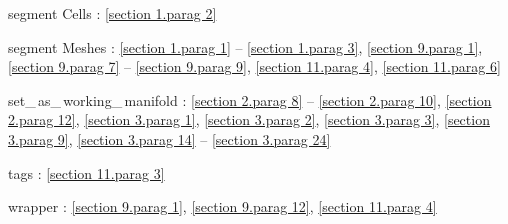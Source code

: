 \documentclass[a4paper]{scrreprt}
\def\numb{}
\newcommand\verm[1]{\textcolor{manif}{#1}}
\renewcommand\tt{\normalfont\ttfamily}
\begin{document}
\noindent
segment {\small\tt \verm{Cell}}s : \ref{\numb section 1.\numb parag 2}

\noindent
segment {\small\tt \verm{Mesh}}es :
\ref{\numb section 1.\numb parag 1} -- \ref{\numb section 1.\numb parag 3},
\ref{\numb section 9.\numb parag 1}, \ref{\numb section 9.\numb parag 7} --
\ref{\numb section 9.\numb parag 9}, \ref{\numb section 11.\numb parag 4},
\ref{\numb section 11.\numb parag 6}

\noindent
{\small\tt set\_\,as\_\,working\_\,manifold} :
\ref{\numb section 2.\numb parag 8} -- \ref{\numb section 2.\numb parag 10},
\ref{\numb section 2.\numb parag 12}, \ref{\numb section 3.\numb parag 1},
\ref{\numb section 3.\numb parag 2}, \ref{\numb section 3.\numb parag 3},
\ref{\numb section 3.\numb parag 9},
\ref{\numb section 3.\numb parag 14} -- \ref{\numb section 3.\numb parag 24}

\noindent
{\small\tt\verm{tag}}s : \ref{\numb section 11.\numb parag 3}

\noindent
wrapper : \ref{\numb section 9.\numb parag 1}, \ref{\numb section 9.\numb parag 12},
\ref{\numb section 11.\numb parag 4}
\end{document}
